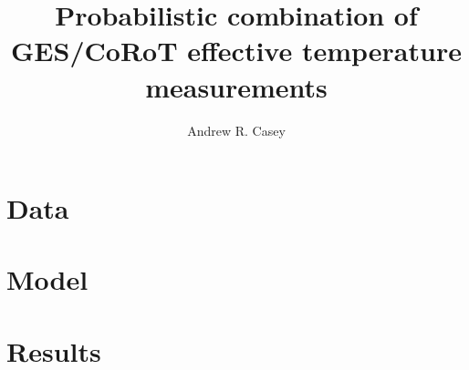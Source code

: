 \documentclass{aastex}
\begin{document}
\title{Probabilistic combination of GES/CoRoT effective temperature measurements}

\author{Andrew R. Casey}




\begin{abstract}
\end{abstract}

\section{Data}




\section{Model}


\section{Results}





\end{document}
